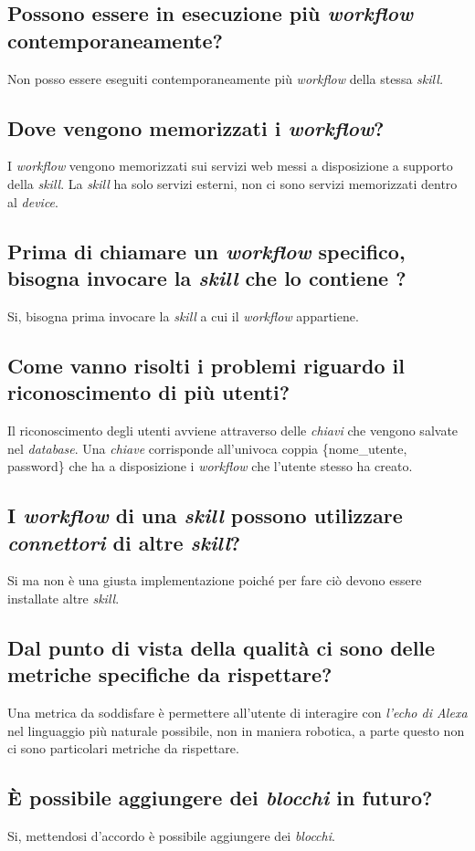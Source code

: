 \documentclass[a4paper,12pt]{article}
\begin{document}
	\subsection{Possono essere in esecuzione più \textit{workflow} contemporaneamente?}
	Non posso essere eseguiti contemporaneamente più \textit{workflow} della stessa \textit{skill.}
	\subsection{Dove vengono memorizzati i \textit{workflow}?}
	I \textit{workflow} vengono memorizzati sui servizi web messi a disposizione a supporto della \textit{skill}. La \textit{skill} ha solo servizi esterni, non ci sono servizi memorizzati dentro al \textit{device}. 
	\subsection{Prima di chiamare un \textit{workflow} specifico, bisogna invocare la \textit{skill} che lo contiene ?}
	Si, bisogna prima invocare la \textit{skill} a cui il \textit{workflow} appartiene.
	\subsection{Come vanno risolti i problemi riguardo il riconoscimento di più utenti?}
	Il riconoscimento degli utenti avviene attraverso delle \textit{chiavi} che vengono salvate nel \textit{database}. Una \textit{chiave} corrisponde all'univoca coppia \{nome\_utente, password\} che ha a disposizione i \textit{workflow} che l'utente stesso  ha creato.
	\subsection{I \textit{workflow} di una \textit{skill} possono utilizzare \textit{connettori}  di altre \textit{skill}?}
	Si ma non è una giusta implementazione poiché per fare ciò devono essere installate altre \textit{skill}.
    \subsection{Dal punto di vista della qualità ci sono delle metriche specifiche da rispettare?}
    Una metrica da soddisfare è permettere all'utente di interagire con \textit{l'echo di Alexa} nel linguaggio più naturale possibile, non in maniera robotica, a parte questo non ci sono particolari metriche da rispettare.
    \subsection{È possibile aggiungere dei \textit{blocchi} in futuro?}
    Si, mettendosi d'accordo è possibile aggiungere dei \textit{blocchi}.	
		\label{LastPage}
\end{document}

